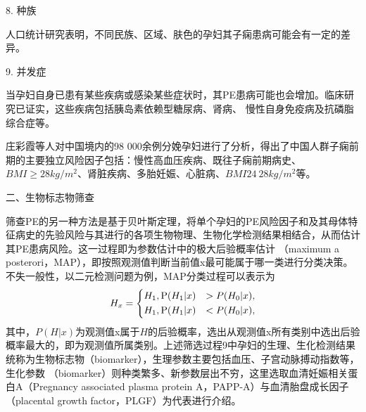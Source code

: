 8. 种族

人口统计研究表明，不同民族、区域、肤色的孕妇其子痫患病可能会有一定的差异\cite{Ghosh2014,Khalil2013}。

9. 并发症

当孕妇自身已患有某些疾病或感染某些症状时，其PE患病可能也会增加\cite{FIGO,Ray2016,OAG9}。临床研究已证实，这些疾病包括胰岛素依赖型糖尿病\cite{Lee2000,Garner1990}、肾病\cite{Martinell1990}、
慢性自身免疫病\cite{Stamilio2000}及抗磷脂综合症\cite{Dreyfus2001,Marchetti2016}等。

        

庄彩霞等人\cite{Zhuang2019}对中国境内的98 000余例分娩孕妇进行了分析，得出了中国人群子痫前期的主要独立风险因子包括：慢性高血压疾病、既往子痫前期病史、$BMI≥28kg/m^2$、肾脏疾病、多胎妊娠、心脏病、$BMI 24~28kg/m^2$等。

二、生物标志物筛查

筛查PE的另一种方法是基于贝叶斯定理，将单个孕妇的PE风险因子和及其母体特征病史的先验风险与其进行的各项生物物理、生物化学检测结果相结合，从而估计其PE患病风险\cite{FIGO}。这一过程即为参数估计中的极大后验概率估计
（maximum a posterori，MAP），即按照观测值判断当前值x最可能属于哪一类进行分类决策\cite{TJXHCL}。不失一般性，以二元检测问题为例，MAP分类过程可以表示为
\begin{equation}
    \label{equ:maxap}
    H_{x}=
    \left \{
    \begin{aligned}
        &H_{1}, \text P(H_{1}|x)&>P(H_{0}|x), \\
        &H_{1}, \text P(H_{1}|x)&<P(H_{0}|x),
    \end{aligned}
    \right.  
\end{equation}
其中，$P(H|x)$为观测值x属于$H$的后验概率，选出从观测值x所有类别中选出后验概率最大的，即为观测值所属类别。上述筛选过程9中孕妇的生理、生化检测结果统称为生物标志物（biomarker），生理参数主要包括血压、子宫动脉搏动指数等，生化参数
（biomarker）则种类繁多、新参数层出不穷\cite{Rene2008,Zhong2015,Zeisler2016,Rana2012}，这里选取血清妊娠相关蛋白A（Pregnancy associated plasma protein A，PAPP-A）与血清胎盘成长因子（placental growth factor，PLGF）为代表进行介绍。

